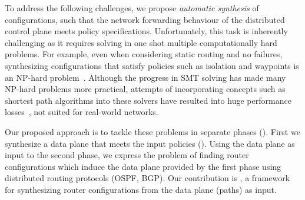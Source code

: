 To address the following challenges, we propose
\emph{automatic synthesis} of configurations, such that 
the network forwarding behaviour of the distributed
control plane meets policy specifications. 
Unfortunately, this task is inherently challenging 
as it requires solving in one shot multiple
computationally hard problems.
For example, even when considering 
static routing and no failures, 
synthesizing configurations 
that satisfy policies 
such as isolation and waypoints
is an NP-hard problem~\cite{genesis}.
Although the progress in SMT solving 
has made many NP-hard problems more practical, 
attempts of incorporating concepts such 
as shortest path algorithms 
into these solvers have resulted 
into huge performance losses~\cite{monosat}, 
not suited for real-world networks.

Our proposed approach is to tackle these problems 
in separate phases
().
First we synthesize a data plane that 
meets the input policies ().
Using the data plane as input 
to the second phase, we 
express the problem of 
finding router configurations which 
induce the data plane provided by the
first phase using distributed routing
protocols (OSPF, BGP). Our contribution 
is \name, a framework for synthesizing
router configurations from the data
plane (paths) as input. 








